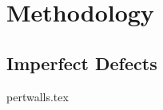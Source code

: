 \documentclass[UKenglish]{texmex/uiomasterthesis}
\begin{document}










\part{Methodology}\label{part:method}








\chapter{Imperfect Defects}\label{chap:pertwalls}
    {{pertwalls.tex}}
\end{document}
